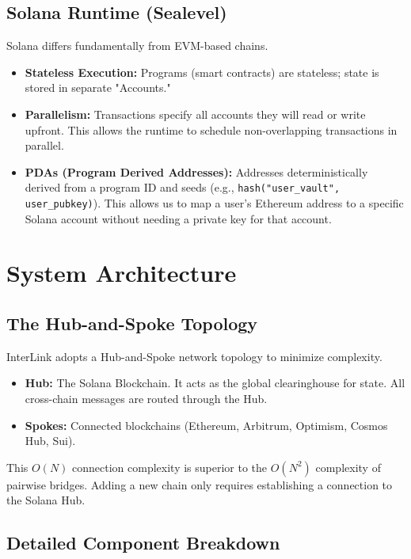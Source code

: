 \documentclass[11pt,a4paper]{article}
\begin{document}
\subsection{Solana Runtime (Sealevel)}
Solana differs fundamentally from EVM-based chains.
\begin{itemize}
    \item \textbf{Stateless Execution:} Programs (smart contracts) are stateless; state is stored in separate "Accounts."
    \item \textbf{Parallelism:} Transactions specify all accounts they will read or write upfront. This allows the runtime to schedule non-overlapping transactions in parallel.
    \item \textbf{PDAs (Program Derived Addresses):} Addresses deterministically derived from a program ID and seeds (e.g., \texttt{hash("user\_vault", user\_pubkey)}). This allows us to map a user's Ethereum address to a specific Solana account without needing a private key for that account.
\end{itemize}

\section{System Architecture}
\label{sec:arch}

\subsection{The Hub-and-Spoke Topology}
InterLink adopts a Hub-and-Spoke network topology to minimize complexity.
\begin{itemize}
    \item \textbf{Hub:} The Solana Blockchain. It acts as the global clearinghouse for state. All cross-chain messages are routed through the Hub.
    \item \textbf{Spokes:} Connected blockchains (Ethereum, Arbitrum, Optimism, Cosmos Hub, Sui).
\end{itemize}
This $O(N)$ connection complexity is superior to the $O(N^2)$ complexity of pairwise bridges. Adding a new chain only requires establishing a connection to the Solana Hub.

\subsection{Detailed Component Breakdown}
\end{document}
